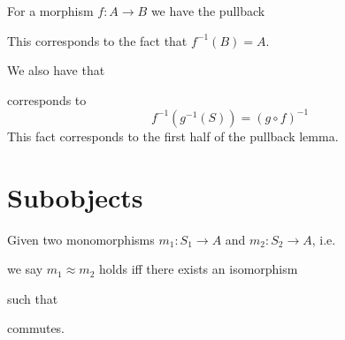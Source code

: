 \begin{remark}
For a morphism $f: A \to B$ we have the pullback
\begin{center}
\end{center}
This corresponds to the fact that $f^{-1}(B) = A$.
\end{remark}

\begin{remark}
We also have that
\begin{center}
\end{center}
corresponds to 
\[ f^{-1}(g^{-1}(S)) = (g \circ f)^{-1} \]
This fact corresponds to the first half of the pullback lemma.
\end{remark}

\section{Subobjects}
\begin{definition}[$\approx$]
	Given two monomorphisms $m_1: S_1 \to A$ and $m_2: S_2 \to A$, i.e.
	\begin{center}
	\end{center}
\end{definition}
we say $m_1 \approx m_2$ holds iff there exists an isomorphism 
 such that
\begin{center}
\end{center}
commutes.

